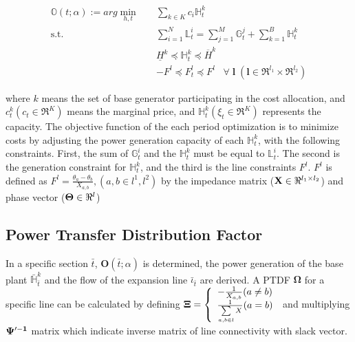 \documentclass[journal]{IEEEtran} %
\begin{document}
\begin{equation}
\begin{aligned}
\mathbb{O}(t;\alpha) := arg\min_{h,t} \quad & \sum_{k \in K}c_{i} \mathbb{H}_{t}^{k}\\
\textrm{s.t.} \quad & \sum_{i=1}^{N} {\mathbb{L}}_{t}^{i} = \sum_{j=1}^{M} {\mathbb{G}}_{t}^{j} + \sum_{k=1}^{B}\mathbb{H}_{t}^{k}\\
\quad & {\underline H  ^k} \preceq \mathbb{H} _t^k \preceq {\overline H  ^k}\\
\quad & -{F^l} \preceq F_t^l \preceq {F^l}\;\;\;\forall \;\textbf{l} \;(\textbf{l} \in \Re^{l_{1}}\times \Re^{l_{2}})
\end{aligned}
\end{equation}


where $k$ means the set of base generator participating in the cost allocation, and $c_{t}^{k}(c_{t}\in\Re^{K})$ means the marginal price, and $\mathbb{H}_{t}^{k}(\xi_{t} \in \Re^{K})$ represents the capacity. The objective function of the each period optimization is to minimize costs by adjusting the power generation capacity of each $\mathbb{H}_{t}^{k}$, with the following constraints. First, the sum of  ${\mathbb{G}}_{t}^{i}$ and the $\mathbb{H}_{t}^{k}$ must be equal to ${{\mathbb{L}}_{t}^{i}}$. The second is the generation constraint for $\mathbb{H}_{t}^{k}$, and the third is the line constraints $F^{l}$. $F^{l}$ is defined as $F^{l} = \frac{\theta_{a} - \theta_{b}}{X_{a,b}}, (a,b \in l^{1},l^{2})$ by the impedance matrix (${\bf{X}} \in \Re^{l_{1} \times l_{2}}$) and phase vector (${\bf{\Theta}} \in \Re^{l}$)

\subsection{Power Transfer Distribution Factor}
In a specific section $\bar t$, $\textbf{O}(\bar t;\alpha)$ is determined, the power generation of the base plant $\bar{\mathbb{H}}_{\bar{t}}^k$ and the flow of the expansion line $\bar{\iota}_{\bar{t}}$ are derived. A PTDF $\boldsymbol{\Omega}$ for a specific line can be calculated by defining $\bf{\Xi} = \left\{ {\begin{array}{*{20}{c}}
{ - \frac{1}{{{X_{a,b}}}}(a \ne b)}\\
{\frac{1}{{\sum\limits_{a,b \in l} X }}(a = b)}
\end{array}} \right.$ and multiplying $\bf{\Psi}'^{-1}$ matrix which indicate inverse matrix of line connectivity with slack vector.
\end{document}
